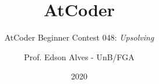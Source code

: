 \title{AtCoder}
\subtitle{AtCoder Beginner Contest 048: {\it Upsolving}}
\author{Prof. Edson Alves - UnB/FGA}
\date{2020}
